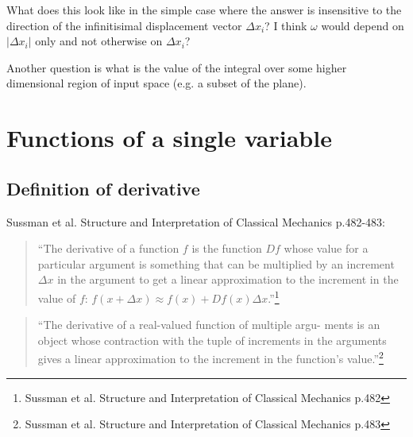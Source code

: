 What does this look like in the simple case where the answer is insensitive to the direction of the
infinitisimal displacement vector $\Delta x_i$? I think $\omega$ would depend on $|\Delta x_i|$ only
and not otherwise on $\Delta x_i$?

Another question is what is the value of the integral over some higher dimensional region of input
space (e.g. a subset of the plane).


\section{Functions of a single variable}

\subsection{Definition of derivative}
Sussman et al. Structure and Interpretation of Classical Mechanics p.482-483:

\begin{quote}
  ``The derivative of a function $f$ is the function $D f$ whose value for a particular
  argument is something that can be multiplied by an increment $\Delta x$ in the argument to get a
  linear approximation to the increment in the value of $f$:
  $f(x + \Delta x) \approx f(x) + D f(x) \Delta x$.''\footnote{Sussman et al. Structure and Interpretation of
    Classical Mechanics p.482}
\end{quote}

\begin{quote}
  ``The derivative of a real-valued function of multiple argu- ments is an object whose contraction
  with the tuple of increments in the arguments gives a linear approximation to the increment in the
  function’s value.''\footnote{Sussman et al. Structure and Interpretation of Classical Mechanics
    p.483}
\end{quote}


